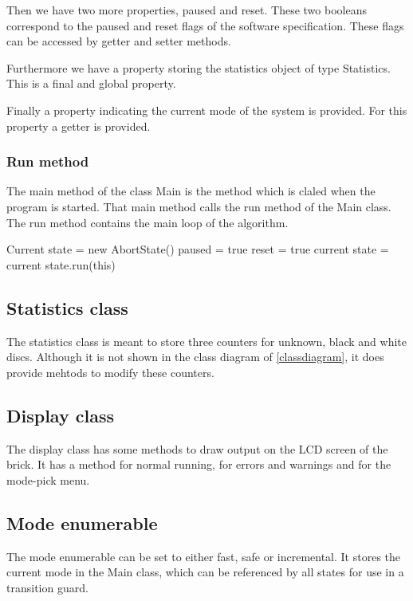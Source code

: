 \documentclass[a4paper,oneside,11pt]{article}
\begin{document}
Then we have two more properties, paused and reset. These two booleans correspond to the paused and reset flags of the software specification. These flags can be accessed by getter and setter methods.

Furthermore we have a property storing the statistics object of type Statistics. This is a final and global property.

Finally a property indicating the current mode of the system is provided. For this property a getter is provided.

\subsubsection{Run method}
The main method of the class Main is the method which is claled when the program is started. That main method calls the run method of the Main class. The run method contains the main loop of the algorithm.

\newpage
\begin{algorithmic}[1]
\State Current state = new AbortState()
\State paused = true
\State reset = true
\EndIf
\State current state = current state.run(this)
\EndWhile
\end{algorithmic}

\subsection{Statistics class}
The statistics class is meant to store three counters for unknown, black and white discs. Although it is not shown in the class diagram of \ref{classdiagram}, it does provide mehtods to modify these counters.

\subsection{Display class}
The display class has some methods to draw output on the LCD screen of the brick. It has a method for normal running, for errors and warnings and for the mode-pick menu.

\subsection{Mode enumerable}
The mode enumerable can be set to either fast, safe or incremental. It stores the current mode in the Main class, which can be referenced by all states for use in a transition guard.
\end{document}
